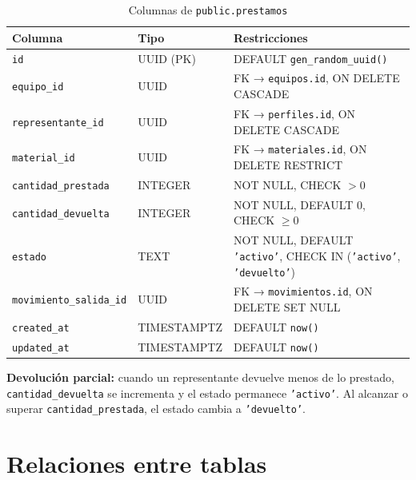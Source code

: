 \documentclass[12pt,a4paper,oneside]{report}
\newcommand{\file}[1]{\texttt{\color{cecyteDark}#1}}
\begin{document}
\begin{table}[H]
\centering
\caption{Columnas de \file{public.prestamos}}
\begin{tabular}{@{}L{4cm}L{4cm}L{7.5cm}@{}}
\toprule
{}
\textbf{Columna} & \textbf{Tipo} & \textbf{Restricciones} \\
\midrule
\file{id}                   & UUID (PK) & DEFAULT \file{gen\_random\_uuid()} \\
\file{equipo\_id}            & UUID      & FK → \file{equipos.id}, ON DELETE CASCADE \\
\file{representante\_id}     & UUID      & FK → \file{perfiles.id}, ON DELETE CASCADE \\
\file{material\_id}          & UUID      & FK → \file{materiales.id}, ON DELETE RESTRICT \\
\file{cantidad\_prestada}    & INTEGER   & NOT NULL, CHECK \(>0\) \\
\file{cantidad\_devuelta}    & INTEGER   & NOT NULL, DEFAULT 0, CHECK \(\ge 0\) \\
\file{estado}                & TEXT      & NOT NULL, DEFAULT \file{'activo'}, CHECK IN (\file{'activo'}, \file{'devuelto'}) \\
\file{movimiento\_salida\_id}& UUID      & FK → \file{movimientos.id}, ON DELETE SET NULL \\
\file{created\_at}            & TIMESTAMPTZ& DEFAULT \file{now()} \\
\file{updated\_at}            & TIMESTAMPTZ& DEFAULT \file{now()} \\
\bottomrule
\end{tabular}
\end{table}

\textbf{Devolución parcial:} cuando un representante devuelve menos de lo prestado, \file{cantidad\_devuelta} se incrementa y el estado permanece \file{'activo'}. Al alcanzar o superar \file{cantidad\_prestada}, el estado cambia a \file{'devuelto'}.

\section{Relaciones entre tablas}
\end{document}
